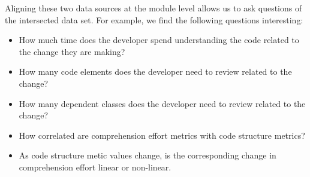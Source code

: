 Aligning these two data sources at the module level allows us to ask questions of the intersected data set.  For example, we find the following questions interesting:

\begin{itemize}
	\item[] How much time does the developer spend understanding the code related to the change they are making?
	\item[] How many code elements does the developer need to review related to the change?
	\item[] How many dependent classes does the developer need to review related to the change?
	\item[] How correlated are comprehension effort metrics with code structure metrics?
	\item[] As code structure metic values change, is the corresponding change in comprehension effort linear or non-linear.
\end{itemize}